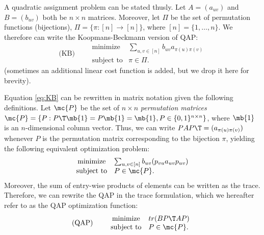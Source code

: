 \documentclass{article} %
\begin{document}

A quadratic assignment problem can be stated thusly.  Let $A=(a_{uv})$ and $B=(b_{uv})$ both be $n \times n$ matrices.   Moreover, let $\Pi$ be the set of permutation functions (bijections), $\Pi=\{\pi : [n] \to [n] \}$, where $[n]=\{1,\ldots, n\}$. We therefore can write the Koopmans-Beckmann version of QAP:
\begin{equation}
\text{(KB)} \qquad  
\begin{array}{cl}
			\text{minimize}   &\sum_{u,v \in [n]} b_{uv}a_{\pi(u)\pi(v)} \\
			\text{subject to}  &\pi \in \Pi.   
\end{array}\label{eq:KB}
\end{equation}
(sometimes an additional linear cost function is added, but we drop it here for brevity).

Equation \ref{eq:KB} can be rewritten in matrix notation given the following definitions. Let $\mc{P}$ be the set of  $n \times n$ \emph{permutation matrices}  $\mc{P}=\{P : P\T \mb{1} = P \mb{1} = \mb{1}, P \in \{0,1\}^{n \times n}\}$, where $\mb{1}$ is an $n$-dimensional column vector. Thus, we can write $PAP\T=(a_{\pi(u)\pi(v)})$ whenever $P$ is the permutation matrix corresponding to the bijection $\pi$, yielding the following equivalent optimization problem:
\begin{equation*}
\begin{array}{cl}
			\text{minimize}   &\sum_{u,v \in [n]} b_{uv} (p_{vu} a_{uv} p_{uv}) \\
			\text{subject to}  &P \in \mc{P}.   
\end{array}\label{eq:QAP}
\end{equation*}
Moreover, the sum of entry-wise products of elements can be written as the trace.  Therefore, we can rewrite the QAP in the trace formulation, which we hereafter refer to as the QAP optimization function:
\begin{equation}
\text{(QAP)} \qquad  
\begin{array}{cl}
			\text{minimize}   & tr(B P\T A P) \\
			\text{subject to}  &P \in \mc{P}.   
\end{array}\label{eq:QAP}
\end{equation}
\end{document}

